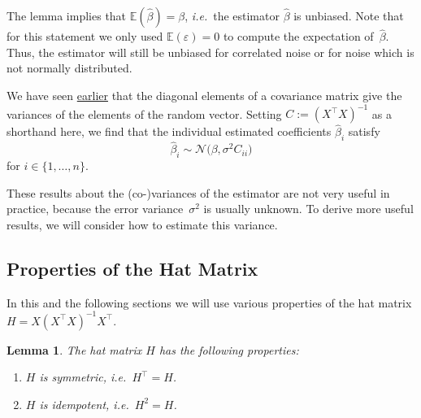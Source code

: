 \documentclass[
  a4paper,
]{article}
\providecommand{\tightlist}{%
  \setlength{\itemsep}{0pt}\setlength{\parskip}{0pt}}
\newtheorem{lemma}{Lemma}[section]
\theoremstyle{definition}
\theoremstyle{definition}
\theoremstyle{definition}
\theoremstyle{definition}
\theoremstyle{remark}
\begin{document}
The lemma implies that \(\mathbb{E}(\hat\beta) = \beta\), \emph{i.e.}~the estimator
\(\hat\beta\) is unbiased. Note that for this statement we only used \(\mathbb{E}(\varepsilon) = 0\) to compute the expectation of~\(\hat\beta\). Thus, the estimator will still
be unbiased for correlated noise or for noise which is not normally distributed.

We have seen \protect\hyperlink{eq:Cov-diag-elem}{earlier} that the diagonal elements
of a covariance matrix give the variances of the elements of the random vector.
Setting \(C := (X^\top X)^{-1}\) as a shorthand here, we find that the
individual estimated coefficients \(\hat\beta_i\) satisfy
\begin{equation}
  \hat\beta_i
  \sim \mathcal{N}\bigl( \beta, \sigma^2 C_{ii} \bigr)  \label{eq:beta-hat-i}
\end{equation}
for \(i \in \{1, \ldots, n\}\).

These results about the (co-)variances of the estimator are not very
useful in practice, because the error variance~\(\sigma^2\) is usually unknown.
To derive more useful results, we will consider how to estimate this
variance.

\hypertarget{hat-matrix}{%
\subsection{Properties of the Hat Matrix}\label{hat-matrix}}

In this and the following sections we will use various
properties of the hat matrix \(H = X (X^\top X)^{-1} X^\top\).

\begin{lemma}

The hat matrix \(H\) has the following properties:

\begin{enumerate}
\def\labelenumi{\arabic{enumi})}
\tightlist
\item
  \(H\) is symmetric, \emph{i.e.}~\(H^\top = H\).
\item
  \(H\) is idempotent, \emph{i.e.}~\(H^2 = H\).
\end{enumerate}

\end{lemma}
\end{document}
